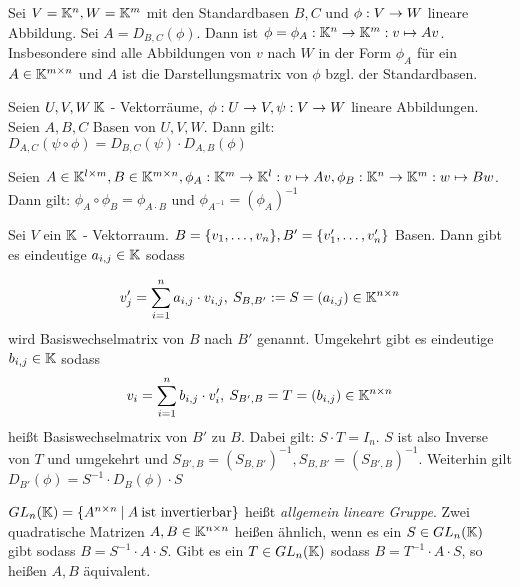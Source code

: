 \begin{definition}
	Sei $V = \mathbb{K}^n, W=\mathbb{K}^m$ mit den Standardbasen $B,C$ und $\phi : V \rightarrow W$ lineare Abbildung. Sei $A=D_{B,C}(\phi)$. Dann ist $\phi = \phi_A : \mathbb{K}^n \rightarrow \mathbb{K}^m : v \mapsto Av$. Insbesondere sind alle Abbildungen von $v$ nach $W$ in der Form $\phi_A$ für ein $A \in \mathbb{K}^{m \times n}$ und $A$ ist die Darstellungsmatrix von $\phi$ bzgl. der Standardbasen.
\end{definition}

\begin{satz}
	Seien $U,V,W \medspace \mathbb{K}$ - Vektorräume, $\phi : U \rightarrow V, \psi : V \rightarrow W$ lineare Abbildungen. Seien $A,B,C$ Basen von $U,V,W$. Dann gilt: $D_{A,C}(\psi \circ \phi) = D_{B,C}(\psi) \cdot D_{A,B}(\phi)$
\end{satz}

\begin{satz}
	Seien $A \in \mathbb{K}^{l \times m}, B \in \mathbb{K}^{m \times n}, \phi_A : \mathbb{K}^m \rightarrow \mathbb{K}^l : v \mapsto Av, \phi_B : \mathbb{K}^n \rightarrow \mathbb{K}^m : w \mapsto Bw$. Dann gilt:  $\phi_A \circ \phi_B = \phi_{A \cdot B}$ und 
	 $\phi_{A^{-1}} = (\phi_A)^{-1}$
\end{satz}

\begin{satz}
	Sei $V$ ein $\mathbb{K}$ - Vektorraum. $B = \{ v_1, \dots, v_n \}, B'=\{v'_1, \dots, v'_n\}$ Basen. Dann gibt es eindeutige $a_{i,j} \in \mathbb{K}$ sodass
	
	\begin{equation*}
		v_j' = \sum_{i=1}^{n} a_{i,j} \cdot v_{i,j}, \medspace S_{B,B'} := S = (a_{i,j}) \in \mathbb{K}^{n \times n}  
	\end{equation*}
	wird Basiswechselmatrix von $B$ nach $B'$ genannt. Umgekehrt gibt es eindeutige $b_{i,j} \in \mathbb{K}$ sodass
	\begin{equation*}
		v_i  = \sum_{i=1}^{n} b_{i,j} \cdot v_i', \medspace S_{B',B} = T = (b_{i,j}) \in \mathbb{K}^{n \times n} 
	\end{equation*}
	heißt Basiswechselmatrix von $B'$ zu $B$. Dabei gilt: $S \cdot T = I_n$. $S$ ist also Inverse von $T$ und umgekehrt und $S_{B', B} = (S_{B,B'})^{-1}, S_{B,B'} = (S_{B',B})^{-1}$. Weiterhin gilt $D_{B'}(\phi) = S^{-1} \cdot D_B(\phi) \cdot S$
\end{satz}

\begin{definition}
	$GL_n(\mathbb{K}) = \{A^{n \times n} \medspace | \medspace A \medspace \textnormal{ist invertierbar}\}$ heißt \emph{allgemein lineare Gruppe}. Zwei quadratische Matrizen $A,B \in \mathbb{K}^{n \times n}$ heißen ähnlich, wenn es ein $S \in GL_n(\mathbb{K})$ gibt sodass $B = S^{-1} \cdot A \cdot S$. Gibt es ein $T \in GL_n(\mathbb{K})$ sodass $B = T^{-1} \cdot A \cdot S$, so heißen $A,B$ äquivalent.
\end{definition}

